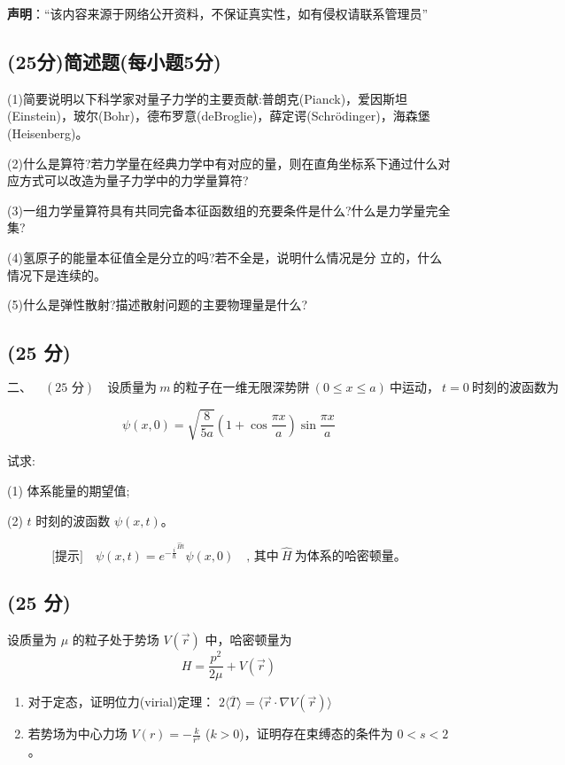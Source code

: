 
\textbf{声明}：“该内容来源于网络公开资料，不保证真实性，如有侵权请联系管理员”

\subsection{(25分)简述题(每小题5分)}
(1)简要说明以下科学家对量子力学的主要贡献:普朗克(Pianck)，爱因斯坦(Einstein)，玻尔(Bohr)，德布罗意(deBroglie)，薛定谔(Schrödinger)，海森堡(Heisenberg)。

(2)什么是算符?若力学量在经典力学中有对应的量，则在直角坐标系下通过什么对应方式可以改造为量子力学中的力学量算符?

(3)一组力学量算符具有共同完备本征函数组的充要条件是什么?什么是力学量完全集?

(4)氢原子的能量本征值全是分立的吗?若不全是，说明什么情况是分
立的，什么情况下是连续的。

(5)什么是弹性散射?描述散射问题的主要物理量是什么?
\subsection{(25 分)}
\[
\text{二、} \quad (25 \text{ 分}) \quad \text{设质量为} \ m \ \text{的粒子在一维无限深势阱} \ (0 \leq x \leq a) \ \text{中运动，} \ t = 0 \ \text{时刻的波函数为}~
\]

\[
\psi(x, 0) = \sqrt{\frac{8}{5a}} \left( 1 + \cos\frac{\pi x}{a} \right) \sin\frac{\pi x}{a}~
\]

试求:

(1) 体系能量的期望值;

(2) $t$ 时刻的波函数 $\psi(x, t)$。

\[
\text{[提示]} \quad \psi(x, t) = e^{- \frac{i}{\hbar}^{\hat H t}} \psi(x, 0) \quad \text{, 其中} \ \hat{H} \ \text{为体系的哈密顿量。}~
\]
\subsection{(25 分)}
设质量为 $\mu$ 的粒子处于势场 $V(\vec{r})$ 中，哈密顿量为
    \[    H = \frac{p^2}{2\mu} + V(\vec{r})~ \]
    \begin{enumerate}
        \item 对于定态，证明位力(virial)定理： $2\langle \overline T \rangle = \langle \vec{r} \cdot \nabla V(\vec{r}) \rangle$
        \item 若势场为中心力场 $V(r) = -\frac{k}{r^s}$ ($k>0$)，证明存在束缚态的条件为 $0 < s < 2$。
    \end{enumerate}
